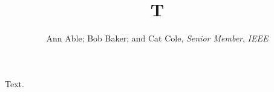 \documentclass{article}
\begin{document}
\title{T}
\author{Ann Able; Bob Baker; and Cat Cole, \textit{Senior Member}, \textit{IEEE}}
\maketitle
Text.
\end{document}

